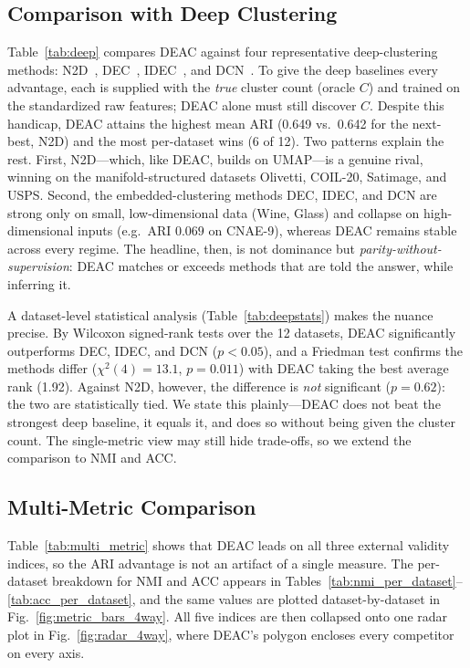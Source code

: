 \documentclass[journal]{IEEEtran}
\begin{document}
\subsection{Comparison with Deep Clustering}

Table~\ref{tab:deep} compares DEAC against four representative deep-clustering
methods: N2D~\cite{mcconville2021n2d}, DEC~\cite{xie2016unsupervised},
IDEC~\cite{guo2017improved}, and DCN~\cite{yang2017towards}. To give the
deep baselines every advantage, each is supplied with the \emph{true} cluster
count (oracle $C$) and trained on the standardized raw features; DEAC alone
must still discover $C$. Despite this handicap, DEAC attains the highest mean
ARI (0.649 vs.\ 0.642 for the next-best, N2D) and the most per-dataset wins
(6 of 12). Two patterns explain the rest. First, N2D---which, like DEAC, builds
on UMAP---is a genuine rival, winning on the manifold-structured datasets
Olivetti, COIL-20, Satimage, and USPS. Second, the embedded-clustering methods
DEC, IDEC, and DCN are strong only on small, low-dimensional data (Wine, Glass)
and collapse on high-dimensional inputs (e.g.\ ARI $0.069$ on CNAE-9), whereas
DEAC remains stable across every regime. The headline, then, is not dominance
but \emph{parity-without-supervision}: DEAC matches or exceeds methods that are
told the answer, while inferring it.



A dataset-level statistical analysis (Table~\ref{tab:deepstats}) makes the
nuance precise. By Wilcoxon signed-rank tests over the 12 datasets, DEAC
significantly outperforms DEC, IDEC, and DCN ($p<0.05$), and a Friedman test
confirms the methods differ ($\chi^2(4){=}13.1$, $p{=}0.011$) with DEAC taking
the best average rank (1.92). Against N2D, however, the difference is
\emph{not} significant ($p{=}0.62$): the two are statistically tied. We state
this plainly---DEAC does not beat the strongest deep baseline, it equals it,
and does so without being given the cluster count. The single-metric view may
still hide trade-offs, so we extend the comparison to NMI and ACC.



\subsection{Multi-Metric Comparison}

Table~\ref{tab:multi_metric} shows that DEAC leads on all three external validity indices, so the ARI advantage is not an artifact of a single measure. The per-dataset breakdown for NMI and ACC appears in Tables~\ref{tab:nmi_per_dataset}--\ref{tab:acc_per_dataset}, and the same values are plotted dataset-by-dataset in Fig.~\ref{fig:metric_bars_4way}. All five indices are then collapsed onto one radar plot in Fig.~\ref{fig:radar_4way}, where DEAC's polygon encloses every competitor on every axis.
\end{document}
